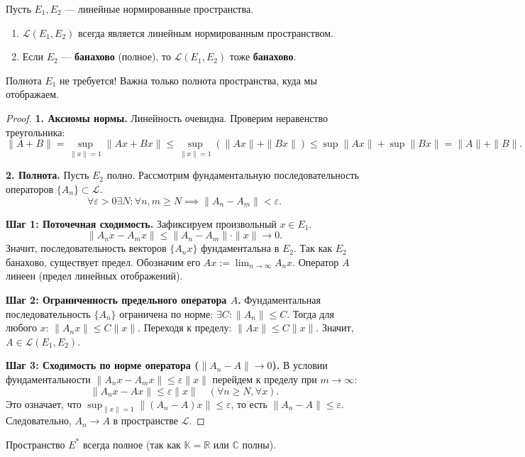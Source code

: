 \begin{theorem}
	Пусть $E_1, E_2$ --- линейные нормированные пространства.
	\begin{enumerate}
		\item $\mathcal{L}(E_1, E_2)$ всегда является линейным нормированным пространством.
		\item Если $E_2$ --- \textbf{банахово} (полное), то $\mathcal{L}(E_1, E_2)$ тоже \textbf{банахово}.
	\end{enumerate}
\end{theorem}

\begin{remark}
	Полнота $E_1$ не требуется! Важна только полнота пространства, куда мы отображаем.
\end{remark}

\begin{proof}
	\textbf{1. Аксиомы нормы.}
	Линейность очевидна. Проверим неравенство треугольника:
	\[ \|A+B\| = \sup_{\|x\|=1} \|Ax + Bx\| \leqslant \sup_{\|x\|=1} (\|Ax\| + \|Bx\|) \leqslant \sup \|Ax\| + \sup \|Bx\| = \|A\| + \|B\|. \]
	
	\textbf{2. Полнота.}
	Пусть $E_2$ полно. Рассмотрим фундаментальную последовательность операторов $\{A_n\} \subset \mathcal{L}$.
	\[ \forall \varepsilon > 0 \exists N: \forall n, m \geqslant N \implies \|A_n - A_m\| < \varepsilon. \]
	
	\textbf{Шаг 1: Поточечная сходимость.}
	Зафиксируем произвольный $x \in E_1$.
	\[ \|A_n x - A_m x\| \leqslant \|A_n - A_m\| \cdot \|x\| \to 0. \]
	Значит, последовательность векторов $\{A_n x\}$ фундаментальна в $E_2$.
	Так как $E_2$ банахово, существует предел. Обозначим его $Ax := \lim_{n \to \infty} A_n x$.
	Оператор $A$ линеен (предел линейных отображений).
	
	\textbf{Шаг 2: Ограниченность предельного оператора $A$.}
	Фундаментальная последовательность $\{A_n\}$ ограничена по норме: $\exists C: \|A_n\| \leqslant C$.
	Тогда для любого $x$: $\|A_n x\| \leqslant C \|x\|$. Переходя к пределу: $\|Ax\| \leqslant C \|x\|$.
	Значит, $A \in \mathcal{L}(E_1, E_2)$.
	
	\textbf{Шаг 3: Сходимость по норме оператора ($\|A_n - A\| \to 0$).}
	В условии фундаментальности $\|A_n x - A_m x\| \leqslant \varepsilon \|x\|$ перейдем к пределу при $m \to \infty$:
	\[ \|A_n x - Ax\| \leqslant \varepsilon \|x\| \quad (\forall n \geqslant N, \forall x). \]
	Это означает, что $\sup_{\|x\|=1} \|(A_n - A)x\| \leqslant \varepsilon$, то есть $\|A_n - A\| \leqslant \varepsilon$.
	Следовательно, $A_n \to A$ в пространстве $\mathcal{L}$.
\end{proof}

\begin{corollary}
	Пространство $E^*$ всегда полное (так как $\mathbb{K} = \mathbb{R}$ или $\mathbb{C}$ полны).
\end{corollary}